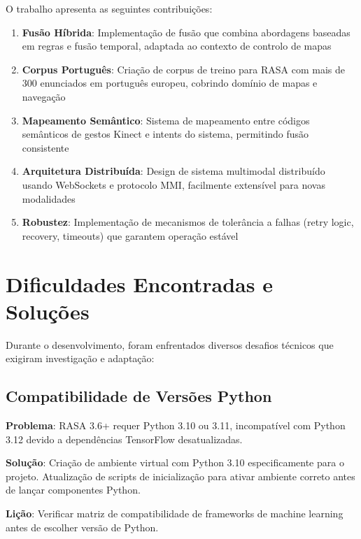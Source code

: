 O trabalho apresenta as seguintes contribuições:

\begin{enumerate}
    \item \textbf{Fusão Híbrida}: Implementação de fusão que combina abordagens baseadas em regras e fusão temporal, adaptada ao contexto de controlo de mapas

    \item \textbf{Corpus Português}: Criação de corpus de treino para RASA com mais de 300 enunciados em português europeu, cobrindo domínio de mapas e navegação

    \item \textbf{Mapeamento Semântico}: Sistema de mapeamento entre códigos semânticos de gestos Kinect e intents do sistema, permitindo fusão consistente

    \item \textbf{Arquitetura Distribuída}: Design de sistema multimodal distribuído usando WebSockets e protocolo MMI, facilmente extensível para novas modalidades

    \item \textbf{Robustez}: Implementação de mecanismos de tolerância a falhas (retry logic, recovery, timeouts) que garantem operação estável
\end{enumerate}

\section{Dificuldades Encontradas e Soluções}

Durante o desenvolvimento, foram enfrentados diversos desafios técnicos que exigiram investigação e adaptação:

\subsection{Compatibilidade de Versões Python}

\textbf{Problema}: RASA 3.6+ requer Python 3.10 ou 3.11, incompatível com Python 3.12 devido a dependências TensorFlow desatualizadas.

\textbf{Solução}: Criação de ambiente virtual com Python 3.10 especificamente para o projeto. Atualização de scripts de inicialização para ativar ambiente correto antes de lançar componentes Python.

\textbf{Lição}: Verificar matriz de compatibilidade de frameworks de machine learning antes de escolher versão de Python.

